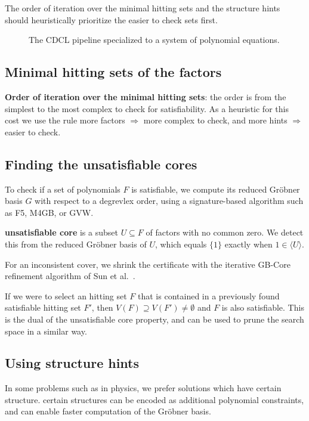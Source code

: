 \documentclass[12pt]{article}
\begin{document}
The order of iteration over the minimal hitting sets and the structure hints should heuristically prioritize the easier to check sets first.

\begin{figure}[p]
\centering
\resizebox{\textwidth}{!}{}
\caption{The CDCL pipeline specialized to a system of polynomial equations.}
\label{fig:cdcl flowchart}
\end{figure}

\subsection*{Minimal hitting sets of the factors}
\textbf{Order of iteration over the minimal hitting sets}: the order is from the simplest to the most complex to check for satisfiability. As a heuristic for this cost we use the rule more factors $\Rightarrow$ more complex to check, and more hints $\Rightarrow$ easier to check.

\subsection*{Finding the unsatisfiable cores}
To check if a set of polynomials $F$ is satisfiable, we compute its reduced Gr\"obner basis $G$ with respect to a degrevlex order, using a signature-based algorithm such as F5, M4GB, or GVW.

\textbf{unsatisfiable core} is a subset $U \subseteq F$ of factors with no common zero. We detect this from the reduced Gr\"obner basis of $U$, which equals $\{1\}$ exactly when $1 \in \langle U \rangle$.

For an inconsistent cover, we shrink the certificate with the iterative
GB-Core refinement algorithm of Sun et al.~\cite[Section~5]{sun2016}.

If we were to select an hitting set $F$ that is contained in a previously found satisfiable hitting set $F'$, then $V(F) \supseteq V(F') \neq \emptyset$ and $F$ is also satisfiable. This is the dual of the unsatisfiable core property, and can be used to prune the search space in a similar way.

\subsection*{Using structure hints}

In some problems such as in physics, we prefer solutions which have certain structure.
certain structures can be encoded as additional polynomial constraints, and can enable faster computation of the Gr\"obner basis.
\end{document}

